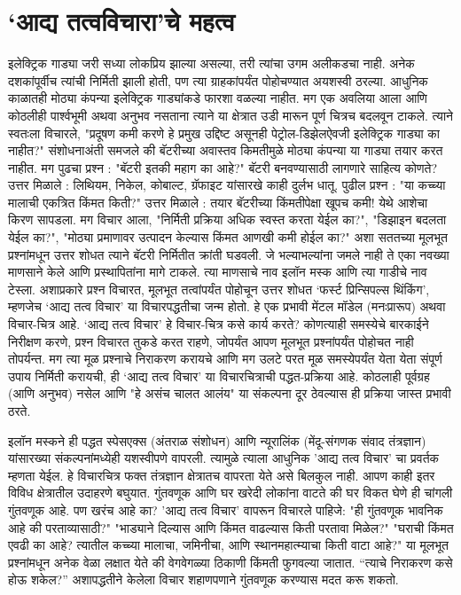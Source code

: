 \chapter{‘आद्य तत्वविचारा’चे महत्व}

इलेक्ट्रिक गाड्या जरी सध्या लोकप्रिय झाल्या असल्या, तरी त्यांचा उगम अलीकडचा नाही. अनेक दशकांपूर्वीच त्यांची निर्मिती झाली होती, पण त्या ग्राहकांपर्यंत पोहोचण्यात अयशस्वी ठरल्या. आधुनिक काळातही मोठ्या कंपन्या इलेक्ट्रिक गाड्यांकडे फारशा वळल्या नाहीत. मग एक अवलिया आला आणि कोठलीही पार्श्वभूमी अथवा अनुभव नसताना त्याने या क्षेत्रात उडी मारून पूर्ण चित्रच बदलवून टाकले. 
त्याने स्वतःला विचारले, "प्रदूषण कमी करणे हे प्रमुख उद्दिष्ट असूनही पेट्रोल-डिझेलऐवजी इलेक्ट्रिक गाड्या का नाहीत?" संशोधनाअंती समजले की बॅटरीच्या अवास्तव किमतीमुळे मोठ्या कंपन्या या गाड्या तयार करत नाहीत. मग पुढचा प्रश्न :  "बॅटरी इतकी महाग का आहे?" बॅटरी बनवण्यासाठी लागणारे साहित्य कोणते? उत्तर मिळाले : लिथियम, निकेल, कोबाल्ट, ग्रॅफाइट यांसारखे काही दुर्लभ धातू. पुढील प्रश्न : "या कच्च्या मालाची एकत्रित किंमत किती?" उत्तर मिळाले : तयार बॅटरीच्या किंमतीपेक्षा खूपच कमी! येथे आशेचा किरण सापडला. मग विचार आला, "निर्मिती प्रक्रिया अधिक स्वस्त करता येईल का?", "डिझाइन बदलता येईल का?", "मोठ्या प्रमाणावर उत्पादन केल्यास किंमत आणखी कमी होईल का?" अशा सततच्या मूलभूत प्रश्नांमधून उत्तर शोधत त्याने बॅटरी निर्मितीत क्रांती घडवली. जे भल्याभल्यांना जमले नाही ते एका नवख्या माणसाने केले आणि प्रस्थापितांना मागे टाकले. त्या माणसाचे नाव इलॉन मस्क आणि त्या गाडीचे नाव टेस्ला.
अशाप्रकारे  प्रश्न विचारत, मूलभूत तत्वांपर्यंत पोहोचून उत्तर शोधत ‘फर्स्ट प्रिन्सिपल्स थिंकिंग’, म्हणजेच ‘आद्य तत्व विचार’ या विचारपद्धतीचा जन्म होतो. हे एक प्रभावी मेंटल मॉडेल (मनःप्रारूप) अथवा विचार-चित्र आहे. 
‘आद्य तत्व विचार’ हे विचार-चित्र कसे कार्य करते?
कोणत्याही समस्येचे बारकाईने निरीक्षण करणे, प्रश्न विचारत तुकडे करत राहणे, जोपर्यंत आपण मूलभूत प्रश्नांपर्यंत पोहोचत नाही तोपर्यन्त. मग त्या मूळ प्रश्नाचे निराकरण करायचे आणि मग उलटे परत मूळ समस्येपर्यंत येता येता संपूर्ण उपाय निर्मिती करायची, ही ‘आद्य तत्व विचार’ या विचारचित्राची पद्धत-प्रक्रिया आहे. कोठलाही पूर्वग्रह (आणि अनुभव) नसेल आणि "हे असंच चालत आलंय" या संकल्पना दूर ठेवल्यास  ही प्रक्रिया जास्त प्रभावी ठरते. 

इलॉन मस्कने ही पद्धत स्पेसएक्स (अंतराळ संशोधन) आणि न्यूरालिंक (मेंदू-संगणक संवाद तंत्रज्ञान) यांसारख्या संकल्पनांमध्येही यशस्वीपणे वापरली. त्यामुळे त्याला आधुनिक 'आद्य तत्व विचार' चा प्रवर्तक म्हणता येईल. हे विचारचित्र फक्त तंत्रज्ञान क्षेत्रातच वापरता येते असे बिलकुल नाही. आपण काही इतर विविध क्षेत्रातील उदाहरणे बघुयात. 
गुंतवणूक आणि घर खरेदी
लोकांना वाटते की घर विकत घेणे ही चांगली गुंतवणूक आहे. पण खरंच आहे का? 'आद्य तत्व विचार' वापरून विचारले पाहिजे: "ही गुंतवणूक भावनिक आहे की परताव्यासाठी?" "भाड्याने दिल्यास आणि किंमत वाढल्यास किती परतावा मिळेल?" "घराची किंमत एवढी का आहे? त्यातील कच्च्या मालाचा, जमिनीचा, आणि स्थानमहात्म्याचा किती वाटा आहे?" या मूलभूत प्रश्नांमधून अनेक वेळा लक्षात येते की वेगवेगळ्या ठिकाणी किंमती फुगवल्या जातात. “त्याचे निराकरण कसे होऊ शकेल?” अशापद्धतीने केलेला विचार शहाणपणाने गुंतवणूक करण्यास मदत करू शकतो.

